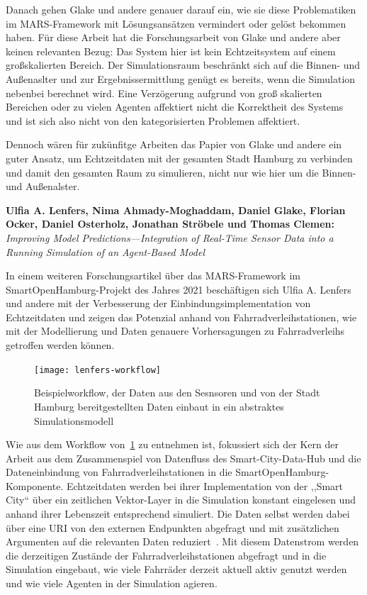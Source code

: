 Danach gehen Glake und andere genauer darauf ein, wie sie diese Problematiken im MARS-Framework mit Lösungsansätzen vermindert oder gelöst bekommen haben.
Für diese Arbeit hat die Forschungsarbeit von Glake und andere aber keinen relevanten Bezug:
Das System hier ist kein Echtzeitsystem auf einem großskalierten Bereich.
Der Simulationsraum beschränkt sich auf die Binnen- und Außenaslter und zur Ergebnissermittlung genügt es bereits, wenn die Simulation nebenbei berechnet wird.
Eine Verzögerung aufgrund von groß skalierten Bereichen oder zu vielen Agenten affektiert nicht die Korrektheit des Systems und ist sich also nicht von den kategorisierten Problemen affektiert.

Dennoch wären für zukünfitge Arbeiten das Papier von Glake und andere ein guter Ansatz, um Echtzeitdaten mit der gesamten Stadt Hamburg zu verbinden und damit den gesamten Raum zu simulieren, nicht nur wie hier um die Binnen- und Außenalster.


\textbf{Ulfia A. Lenfers, Nima Ahmady-Moghaddam, Daniel Glake, Florian Ocker, Daniel Osterholz, Jonathan Ströbele und Thomas Clemen:}
\textit{Improving Model Predictions—Integration of Real-Time Sensor Data into a Running Simulation of an Agent-Based Model}

In einem weiteren Forschungsartikel über das MARS-Framework im SmartOpenHamburg-Projekt des Jahres 2021 beschäftigen sich Ulfia A. Lenfers und andere mit der Verbesserung der Einbindungsimplementation von Echtzeitdaten und zeigen das Potenzial anhand von Fahrradverleihstationen, wie mit der Modellierung und Daten genauere Vorhersagungen zu Fahrradverleihs getroffen werden können.

\begin{figure}[h]
    \centering
    \texttt{[image: lenfers-workflow]}~\caption{Beispielworkflow, der Daten aus den Sesnsoren und von der Stadt Hamburg bereitgestellten Daten einbaut in ein abstraktes Simulationsmodell~\cite{Lenfers-MP-2021}}
    \label{fig:lenfers-workflow-sensors}
\end{figure}

Wie aus dem Workflow von~\ref{fig:lenfers-workflow-sensors} zu entnehmen ist, fokussiert sich der Kern der Arbeit aus dem Zusammenspiel von Datenfluss des Smart-City-Data-Hub und die Dateneinbindung von Fahrradverleihstationen in die SmartOpenHamburg-Komponente.
Echtzeitdaten werden bei ihrer Implementation von der ,,Smart City`` über ein zeitlichen Vektor-Layer in die Simulation konstant eingelesen und anhand ihrer Lebenszeit entsprechend simuliert\cite{Lenfers-MP-2021}.
Die Daten selbst werden dabei über eine URI von den externen Endpunkten abgefragt und mit zusätzlichen Argumenten auf die relevanten Daten reduziert~.
Mit diesem Datenstrom werden die derzeitigen Zustände der Fahrradverleihstationen abgefragt und in die Simulation eingebaut, wie viele Fahrräder derzeit aktuell aktiv genutzt werden und wie viele Agenten in der Simulation agieren\cite{Lenfers-MP-2021}.

